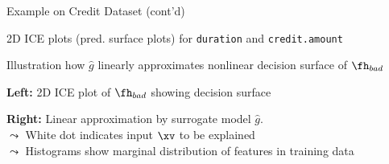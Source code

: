 \documentclass[10pt,compress,t,notes=noshow, xcolor=table]{beamer}
\newcommand{\gh}{\hat{g}}
\begin{document}
\begin{framev}[align=top]{Example on Credit Dataset (cont'd)}
\begin{itemizeM}
\item 2D ICE plots (pred. surface plots) for \texttt{duration} and \texttt{credit.amount}
\item Illustration how $\gh$ linearly approximates nonlinear decision surface of $\fh_{bad}$
\end{itemizeM}
\begin{itemizeM}
\item \textbf{Left:} 2D ICE plot of $\fh_{bad}$ showing decision surface
\item \textbf{Right:} Linear approximation by surrogate model $\gh$. \\
$\leadsto$ White dot indicates input $\xv$ to be explained \\
$\leadsto$ Histograms show marginal distribution of features in training data %
\end{itemizeM}
\end{framev}

%
%
%
\end{document}
